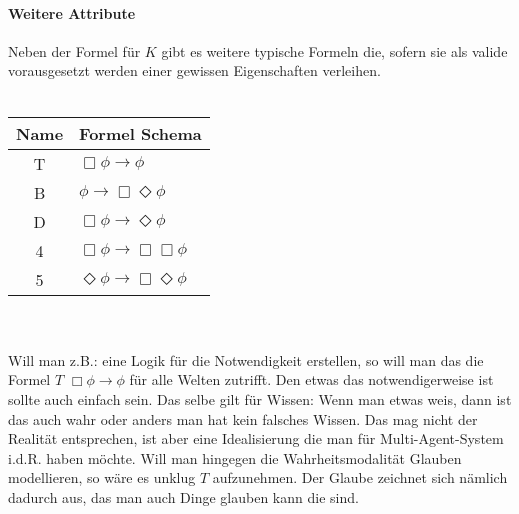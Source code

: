 \paragraph{Weitere Attribute} %
\label{par:weitere_attribute} 

Neben der Formel für $K$ gibt es weitere typische Formeln die, sofern sie als valide vorausgesetzt werden einer \NML gewissen Eigenschaften verleihen.\\
\\
%
\curr
\label{tab:attributes}
\begin{tabular}{cl}
\hline
\hline
Name & Formel Schema\\
\hline
T & $\Box \phi \rightarrow \phi$\\
B & $\phi \rightarrow \Box \Diamond\phi$\\
D & $\Box \phi \rightarrow \Diamond \phi$\\
4 & $\Box \phi \rightarrow \Box \Box \phi$\\
5 & $\Diamond \phi \rightarrow \Box \Diamond \phi$\\
\hline
\end{tabular}\\
\\
Will man z.B.: eine Logik für die Notwendigkeit erstellen, so will man das die Formel $T$ $\Box \phi \rightarrow \phi$ für alle Welten zutrifft.
Den etwas das notwendigerweise \true ist sollte auch einfach \true sein.
Das selbe gilt für Wissen: Wenn man etwas weis, dann ist das auch wahr oder anders man hat kein falsches Wissen.
Das mag nicht der Realität entsprechen, ist aber eine Idealisierung die man für Multi-Agent-System i.d.R. haben möchte.
Will man hingegen die Wahrheitsmodalität Glauben modellieren, so wäre es unklug $T$ aufzunehmen.
Der Glaube zeichnet sich nämlich dadurch aus, das man auch Dinge glauben kann die \false sind.\\
\\
